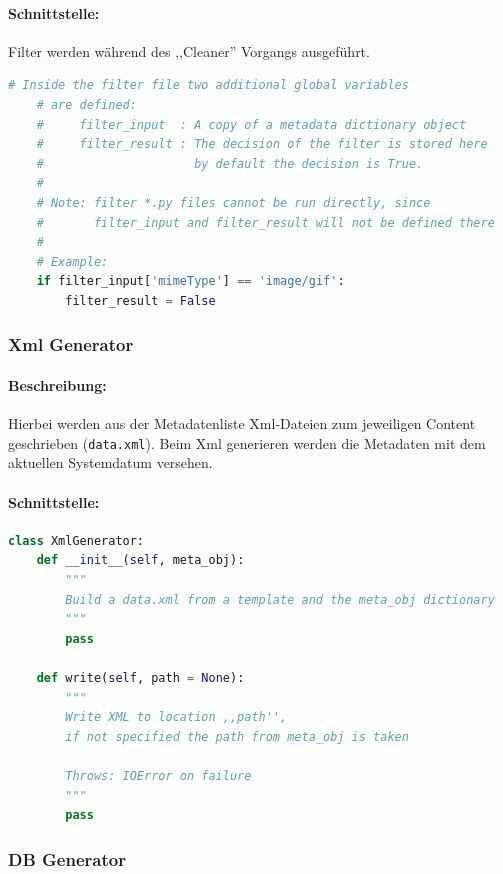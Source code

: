 \paragraph{Schnittstelle:}
\label{par:schnittstelle_}
Filter werden während des ,,Cleaner'' Vorgangs ausgeführt.
\begin{lstlisting}[language=python]
    # Inside the filter file two additional global variables
    # are defined:
    #     filter_input  : A copy of a metadata dictionary object
    #     filter_result : The decision of the filter is stored here
    #                     by default the decision is True.
    #
    # Note: filter *.py files cannot be run directly, since 
    #       filter_input and filter_result will not be defined there
    #
    # Example:
    if filter_input['mimeType'] == 'image/gif':
        filter_result = False
\end{lstlisting}


\subsubsection{Xml Generator}
\label{ssub:xmlgen}
\paragraph{Beschreibung:}
\label{par:beschreibung_}
Hierbei werden aus der Metadatenliste Xml-Dateien zum jeweiligen Content
geschrieben (\texttt{data.xml}). 
Beim Xml generieren werden die Metadaten mit dem aktuellen Systemdatum versehen.
\paragraph{Schnittstelle:}
\label{par:schnittstelle_}

\begin{lstlisting}[language=python]
class XmlGenerator:
    def __init__(self, meta_obj):
        """
        Build a data.xml from a template and the meta_obj dictionary
        """
        pass

    def write(self, path = None):
        """
        Write XML to location ,,path'', 
        if not specified the path from meta_obj is taken

        Throws: IOError on failure
        """
        pass
\end{lstlisting}

\subsubsection{DB Generator}
\label{ssub:dbgen}

